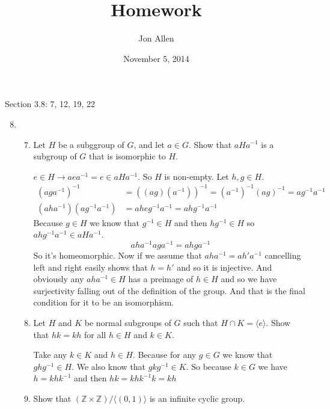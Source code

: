\documentclass[letterpaper]{article}
\begin{document}
\title{Homework}
\date{November 5, 2014}
\author{Jon Allen}
\maketitle
Section 3.8: 7, 12, 19, 22
\renewcommand{\labelenumi}{3.\arabic{enumi}}
\renewcommand{\labelenumii}{\arabic{enumii}.}
\renewcommand{\labelenumiii}{(\alph{enumiii})}
\begin{enumerate}
\setcounter{enumi}{7}
\item
  \begin{enumerate}
  \setcounter{enumii}{6}
  \item
    Let $H$ be a subggroup of $G$, and let $a\in G$. Show that $aHa^{-1}$ is a subgroup of $G$ that is isomorphic to $H$.

    $e\in H\to aea^{-1}=e\in aHa^{-1}$. So $H$ is non-empty. Let $h,g\in H$.
    \begin{align*}
      (aga^{-1})^{-1}&=((ag)(a^{-1}))^{-1}=(a^{-1})^{-1}(ag)^{-1}=ag^{-1}a^{-1}\\
      (aha^{-1})(ag^{-1}a^{-1})&=aheg^{-1}a^{-1}=ahg^{-1}a^{-1}
    \end{align*}
    Because $g\in H$ we know that $g^{-1}\in H$ and then $hg^{-1}\in H$ so $ahg^{-1}a^{-1}\in aHa^{-1}$.
    \[aha^{-1}aga^{-1}=ahga^{-1}\]
    So it's homeomorphic. Now if we assume that $aha^{-1}=ah'a^{-1}$ cancelling left and right easily  shows that $h=h'$ and so it is injective. And obviously any $aha^{-1}\in H$ has a preimage of $h\in H$ and so we have surjectivity falling out of the definition of the group. And that is the final condition for it to be an isomorphism.
  \setcounter{enumii}{11}
  \item
    Let $H$ and $K$ be normal subgroups of $G$ such that $H\cap K=\langle e\rangle$. Show that $hk=kh$ for all $h\in H$ and $k\in K$.

    Take any $k\in K$ and $h\in H$. Because for any $g\in G$ we know that $ghg^{-1}\in H$. We also know that $gkg^{-1}\in K$.
    So because $k\in G$ we have $h=khk^{-1}$ and then $hk=khk^{-1}k=kh$
  \setcounter{enumii}{18}
  \item
    Show that $(\mathbb{Z}\times \mathbb{Z})/\langle (0,1)\rangle$ is an infinite cyclic group.


\end{enumerate}
\end{enumerate}
\end{document}
